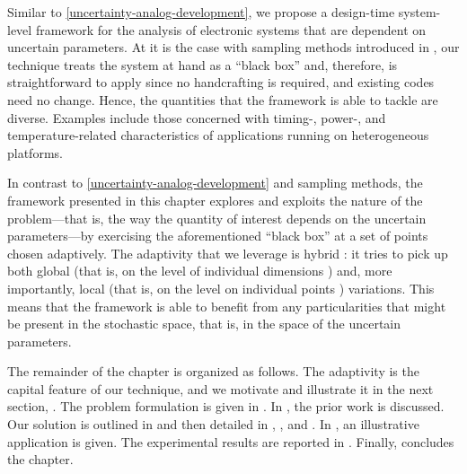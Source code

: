Similar to \cref{uncertainty-analog-development}, we propose a design-time
system-level framework for the analysis of electronic systems that are dependent
on uncertain parameters. At it is the case with sampling methods introduced in
, our technique treats the system at hand as a ``black box'' and,
therefore, is straightforward to apply since no handcrafting is required, and
existing codes need no change. Hence, the quantities that the framework is able
to tackle are diverse. Examples include those concerned with timing-, power-,
and temperature-related characteristics of applications running on heterogeneous
platforms.

In contrast to \cref{uncertainty-analog-development} and sampling methods, the
framework presented in this chapter explores and exploits the nature of the
problem---that is, the way the quantity of interest depends on the uncertain
parameters---by exercising the aforementioned ``black box'' at a set of points
chosen adaptively. The adaptivity that we leverage is hybrid \cite{jakeman2012}:
it tries to pick up both global (that is, on the level of individual dimensions
\cite{klimke2006}) and, more importantly, local (that is, on the level on
individual points \cite{ma2009}) variations. This means that the framework is
able to benefit from any particularities that might be present in the stochastic
space, that is, in the space of the uncertain parameters.

The remainder of the chapter is organized as follows. The adaptivity is the
capital feature of our technique, and we motivate and illustrate it in the next
section, . The problem formulation is given in
. In , the prior work is
discussed. Our solution is outlined in  and then
detailed in , ,
and . In , an
illustrative application is given. The experimental results are reported in
. Finally,  concludes the
chapter.
